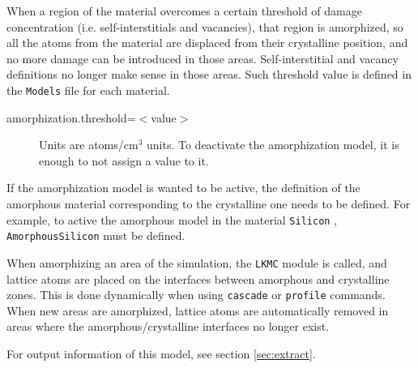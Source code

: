 \label{sec:amorph}

When a region of the material overcomes a certain threshold of damage concentration (i.e. self-interstitials and vacancies), that region is amorphized, so all the atoms from the material are displaced from their crystalline position, and no more damage can be introduced in those areas. Self-interstitial and vacancy definitions no longer make sense in those areas. Such threshold value is defined in the {\tt Models} file for each material. 

\begin{description}
\item [amorphization.threshold=$<$value$>$] Units are atoms/cm$^3$ units. To deactivate the amorphization model, it is enough to not assign a value to it.
\end{description}

If the amorphization model is wanted to be active, the definition of the amorphous material corresponding to the crystalline one needs to be defined. For example, to active the amorphous model in the material {\tt Silicon} , {\tt AmorphousSilicon} must be defined.

When amorphizing an area of the simulation, the {\tt LKMC} module is called, and lattice atoms are placed on the interfaces between amorphous and crystalline zones. This is done dynamically when using {\tt cascade} or {\tt profile} commands. When new areas are amorphized, lattice atoms are automatically removed in areas where the amorphous/crystalline interfaces no longer exist. 

For output information of this model, see section \ref{sec:extract}.


